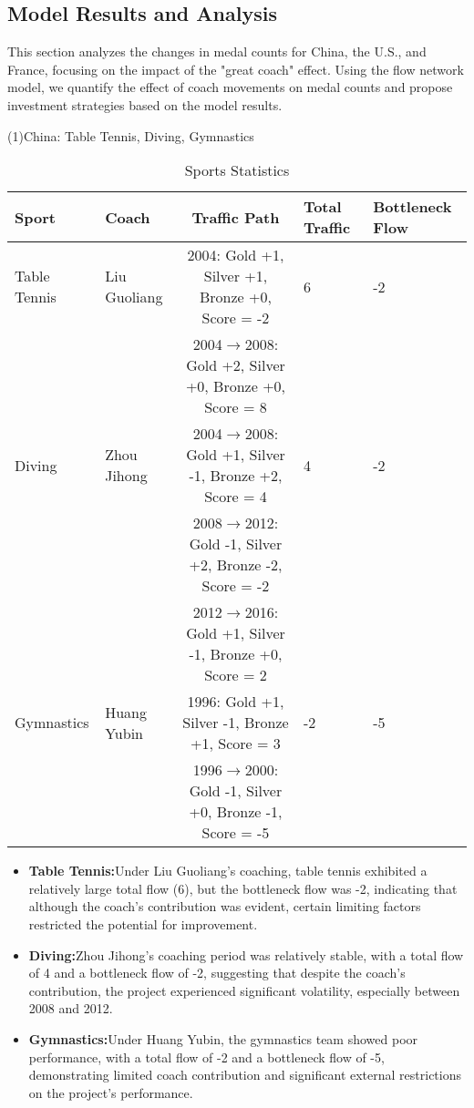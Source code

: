 \documentclass{mcmthesis}
\begin{document}
\subsection{Model Results and Analysis}

    This section analyzes the changes in medal counts for China, the U.S., and France, focusing on the impact of the "great coach" effect. Using the flow network model, we quantify the effect of coach movements on medal counts and propose investment strategies based on the model results.

    (1)China: Table Tennis, Diving, Gymnastics
    \begin{table}[ht]
        \centering
        \begin{tabular}{|p{2cm}|p{1cm}|c|p{1cm}|p{2cm}|}
        \hline
        Sport & Coach & Traffic Path & Total Traffic & Bottleneck Flow \\
        \hline
        Table Tennis & Liu Guoliang & 2004: Gold +1, Silver +1, Bronze +0, Score = -2 & 6 & -2 \\
         & & 2004$\to$2008: Gold +2, Silver +0, Bronze +0, Score = 8 & & \\
        \hline
        Diving & Zhou Jihong & 2004$\to$2008: Gold +1, Silver -1, Bronze +2, Score = 4 & 4 & -2 \\
         & & 2008$\to$2012: Gold -1, Silver +2, Bronze -2, Score = -2 & & \\
         & & 2012$\to$2016: Gold +1, Silver -1, Bronze +0, Score = 2 & & \\
        \hline
        Gymnastics & Huang Yubin & 1996: Gold +1, Silver -1, Bronze +1, Score = 3 & -2 & -5 \\
         & & 1996$\to$2000: Gold -1, Silver +0, Bronze -1, Score = -5 & & \\
        \hline
        \end{tabular}
        \caption{Sports Statistics}
    \end{table}

    \begin{itemize}
        \item {\bf Table Tennis:}Under Liu Guoliang's coaching, table tennis exhibited a relatively large total flow (6), but the bottleneck flow was -2, indicating that although the coach's contribution was evident, certain limiting factors restricted the potential for improvement.      
        \item {\bf Diving:}Zhou Jihong's coaching period was relatively stable, with a total flow of 4 and a bottleneck flow of -2, suggesting that despite the coach’s contribution, the project experienced significant volatility, especially between 2008 and 2012.    
        \item {\bf Gymnastics:}Under Huang Yubin, the gymnastics team showed poor performance, with a total flow of -2 and a bottleneck flow of -5, demonstrating limited coach contribution and significant external restrictions on the project’s performance.
    \end{itemize}
\end{document}
